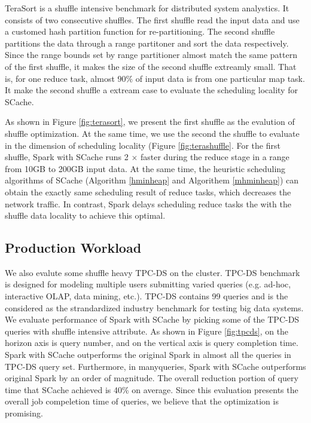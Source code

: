 TeraSort\cite{spark-tera} is a shuffle intensive benchmark for distributed system analystics. It consists of two consecutive shuffles. The first shuffle read the input data and use a customed hash partition function for re-partitioning. The second shuffle partitions the data through a range partitoner and sort the data respectively. Since the range bounds set by range partitioner almost match the same pattern of the first shuffle, it makes the size of the second shuffle extreamly small. That is, for one reduce task, almost $90\%$ of input data is from one particular map task. It make the second shuffle a extream case to evaluate the scheduling locality for SCache. 

As shown in Figure \ref{fig:terasort}, we present the first shuffle as the evalution of shuffle optimization. At the same time, we use the second the shuffle to evaluate in the dimension of scheduling locality (Figure \ref{fig:terashuffle}. For the first shuffle, Spark with SCache runs 2 $\times$ faster during the reduce stage in a range from 10GB to 200GB input data. At the same time, the heuristic scheduling algorithms of SCache (Algorithm \ref{hminheap} and Algorithem \ref{mhminheap}) can obtain the exactly same scheduling result of reduce tasks, which decreases the network traffic. In contrast, Spark delays scheduling reduce tasks the with the shuffle data locality to achieve this optimal.

\subsection{Production Workload}

We also evalute some shuffle heavy TPC-DS\cite{tpcds} on the cluster. TPC-DS benchmark is designed for modeling multiple users submitting varied queries (e.g. ad-hoc, interactive OLAP, data mining, etc.). TPC-DS contains 99 queries and is the considered as the  strandardized industry benchmark for testing big data systems. We evaluate performance of Spark with SCache by picking some of the TPC-DS queries with shuffle intensive attribute. As shown in Figure \ref{fig:tpcds}, on the horizon axis is query number, and on the vertical axis is query completion time. Spark with SCache outperforms the original Spark in almost all the queries in TPC-DS query set. Furthermore, in manyqueries, Spark with SCache outperforms original Spark by an order of magnitude. The overall reduction portion of query time that SCache achieved is 40\% on average. Since this evaluation presents the overall job compeletion time of queries, we believe that the optimization is promising.

